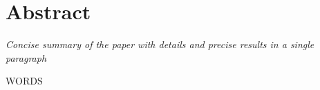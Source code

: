 \section{Abstract}
\textit{Concise summary of the paper with details and precise results in a single paragraph
}

\begin{keywords}
WORDS
\end{keywords}